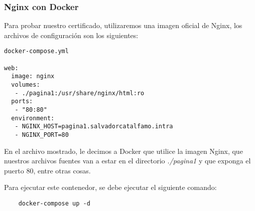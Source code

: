 \subsubsection*{Nginx con Docker}

Para probar nuestro certificado, utilizaremos una imagen oficial de Nginx, 
los archivos de configuración
son los siguientes:


\begin{verbatim}
docker-compose.yml

web:
  image: nginx
  volumes:
   - ./pagina1:/usr/share/nginx/html:ro
  ports:
   - "80:80"
  environment:
   - NGINX_HOST=pagina1.salvadorcatalfamo.intra
   - NGINX_PORT=80
\end{verbatim}

En el archivo mostrado, le decimos a Docker que utilice la imagen Nginx, 
que nuestros archivos fuentes
van a estar en el directorio \textit{./pagina1} y que exponga el puerto 80, entre otras
 cosas.

\noindent Para ejecutar este contenedor, se debe ejecutar el siguiente comando:

\begin{verbatim}
    docker-compose up -d
\end{verbatim}



